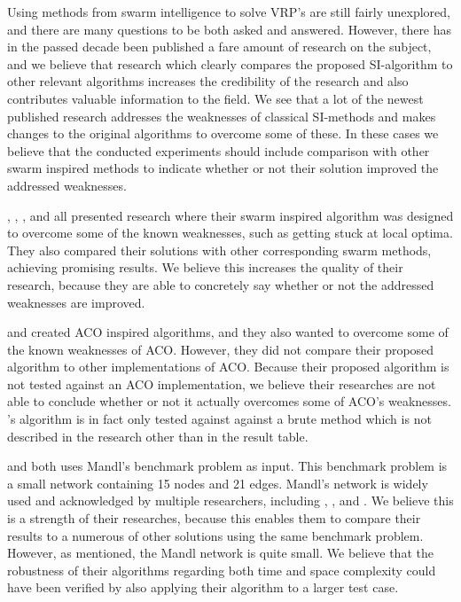 Using methods from swarm intelligence to solve VRP's are still fairly unexplored, and there are many questions to be both asked and answered. However, there has in the passed decade been published a fare amount of research on the subject, and we believe that research which clearly compares the proposed SI-algorithm to other relevant algorithms increases the credibility of the research and also contributes valuable information to the field. We see that a lot of the newest published research addresses the weaknesses of classical SI-methods and makes changes to the original algorithms to overcome some of these. In these cases we believe that the conducted experiments should include comparison with other swarm inspired methods to indicate whether or not their solution improved the addressed weaknesses. 

\citet{tripathi09}, \citet{yang07}, \citet{salehinejad10}, and \citet{jiang10} all presented research where their swarm inspired algorithm was designed to overcome some of the known weaknesses, such as getting stuck at local optima. They also compared their solutions with other corresponding swarm methods, achieving promising results. We believe this increases the quality of their research, because they are able to concretely say whether or not the addressed weaknesses are improved. 

\citet{hsiao04} and \citet{sedighpour14} created ACO inspired algorithms, and they also wanted to overcome some of the known weaknesses of ACO. However, they did not compare their proposed algorithm to other implementations of ACO. Because their proposed algorithm is not tested against an ACO implementation, we believe their researches are not able to conclude whether or not it actually overcomes some of ACO's weaknesses. \citet{hsiao04}'s algorithm is in fact only tested against against a brute method which is not described in the research other than in the result table. 

\citet{nikolic14} and \citet{kechagiopoulos14} both uses Mandl's benchmark problem as input. This benchmark problem is a small network containing 15 nodes and 21 edges.  Mandl's network is widely used and acknowledged by multiple researchers, including \citet{nikolic14}, \citet{kechagiopoulos14}, and \citet{fan09}. We believe this is a strength of their researches, because this enables them to compare their results to a numerous of other solutions using the same benchmark problem. However, as mentioned, the Mandl network is quite small. We believe that the robustness of their algorithms regarding both time and space complexity could have been verified by also applying their algorithm to a larger test case. 

